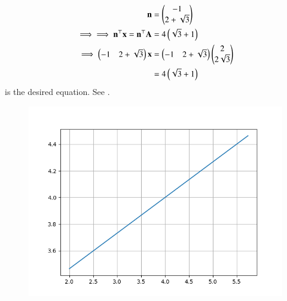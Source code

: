     \begin{align}
	    \mathbf{n} &= \begin{pmatrix}-1\\2+\sqrt{3}\end{pmatrix}
        \label{eq:11/10/2/4normal-vec}
	\\
	    \implies
        \implies \mathbf{n}^\top\mathbf{x} = \mathbf{n}^\top\mathbf{A} &= 4\left(\sqrt{3}+1\right) \\
        \implies \begin{pmatrix}-1&2+\sqrt{3}\end{pmatrix}\mathbf{x} &=\begin{pmatrix}-1&2+\sqrt{3}\end{pmatrix}\begin{pmatrix}2\\2\sqrt{3}\end{pmatrix}  
	    \\
	    &= 4\left(\sqrt{3}+1\right)
        \label{eq:11/10/2/4line}
    \end{align}
is the desired equation.  See .
    \begin{figure}[!ht]
        \centering
        \includegraphics[width=\columnwidth]{chapters/11/10/2/4/figs/line.png}
        \caption{}
        \label{fig:11/10/2/4line}
    \end{figure}
